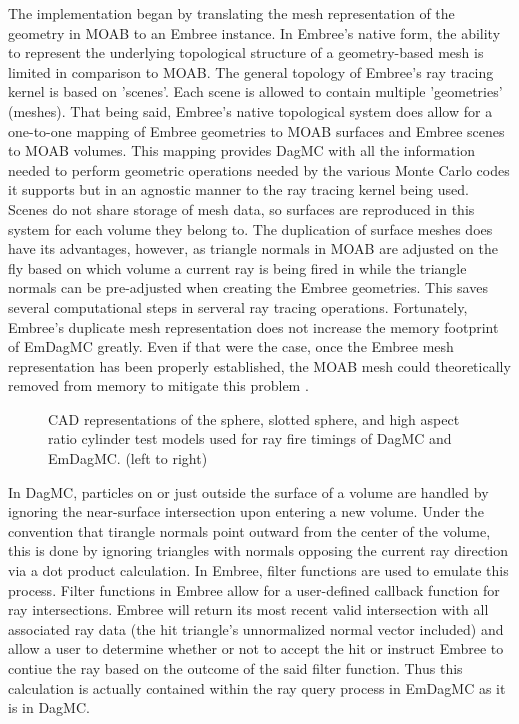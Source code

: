 \documentclass{anstrans}
\begin{document}
The implementation began by translating the mesh representation of the geometry in MOAB to an Embree instance. In Embree's native form, the ability to represent the underlying topological structure of a geometry-based mesh is limited in comparison to MOAB. The general topology of Embree's ray tracing kernel is based on 'scenes'.  Each scene is allowed to contain multiple 'geometries' (meshes). That being said, Embree's native topological system does allow for a one-to-one mapping of Embree geometries to MOAB surfaces and Embree scenes to MOAB volumes. This mapping provides DagMC with all the information needed to perform geometric operations needed by the various Monte Carlo codes it supports but in an agnostic manner to the ray tracing kernel being used. Scenes do not share storage of mesh data, so surfaces are reproduced in this system for each volume they belong to. The duplication of surface meshes does have its advantages, however, as triangle normals in MOAB are adjusted on the fly based on which volume a current ray is being fired in while the triangle normals can be pre-adjusted when creating the Embree geometries. This saves several computational steps in serveral ray tracing operations. Fortunately, Embree's duplicate mesh representation does not increase the memory footprint of EmDagMC greatly. Even if that were the case, once the Embree mesh representation has been properly established, the MOAB mesh could theoretically removed from memory to mitigate this problem
.
\begin{figure}

  \begin{center}

    \caption{CAD representations of the sphere, slotted sphere, and high aspect ratio cylinder test models used for ray fire timings of DagMC and EmDagMC. (left to right) \label{models}}

  \end{center}
\vspace{-0.3cm}

\end{figure} 

In DagMC, particles on or just outside the surface of a volume are handled by ignoring the near-surface intersection upon entering a new volume. Under the convention that tirangle normals point outward from the center of the volume, this is done by ignoring triangles with normals opposing the current ray direction via a dot product calculation. In Embree, filter functions are used to emulate this process. Filter functions in Embree allow for a user-defined callback function for ray intersections. Embree will return its most recent valid intersection with all associated ray data (the hit triangle's unnormalized normal vector included) and allow a user to determine whether or not to accept the hit or instruct Embree to contiue the ray based on the outcome of the said filter function. Thus this calculation is actually contained within the ray query process in EmDagMC as it is in DagMC.
\end{document}
